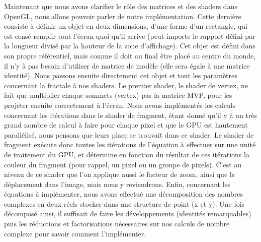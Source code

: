 \documentclass[11pt]{article}
\begin{document}
Maintenant que nous avons clarifier le rôle des matrices et des shaders dans
OpenGL, nous allons pouvoir parler de notre implémentation. Cette dernière
consiste à définir un objet en deux dimensions, d'une forme d'un rectangle, qui
est censé remplir tout l'écran quoi qu'il arrive (peut importe le rapport défini
par la longueur divisé par la hauteur de la zone d'affichage). Cet objet est
défini dans son propre référentiel, mais comme il doit au final être placé au
centre du monde, il n'y à pas besoin d'utiliser de matrice de modèle (elle sera
égale à une matrice identité). Nous passons ensuite directement cet objet et
tout les paramètres concernant la fractale à nos shaders. Le premier shader, le
shader de vertex, ne fait que multiplier chaque sommets (vertex) par la matrice
MVP, pour les projeter ensuite correctement à l'écran. Nous avons implémentés
les calculs concernant les itérations dans le shader de fragment, étant donné
qu'il y à un très grand nombre de calcul à faire pour chaque pixel et que le GPU
est hautement parallélisé, nous pensons que leurs place se trouvait dans ce
shader. Le shader de fragment exécute donc toutes les itérations de l'équation
à effectuer sur une unité de traitement du GPU, et détermine en fonction du
résultat de ces itérations la couleur du fragment (pour rappel, un pixel ou un
groupe de pixels). C'est au niveau de ce shader que l'on applique aussi le
facteur de zoom, ainsi que le déplacement dans l'image, mais nous y reviendrons.
Enfin, concernant les équations à implémenter, nous avons effectué une
décomposition des nombres complexes en deux réels stocker dans une structure de
point (x et y). Une fois décomposé ainsi, il suffisait de faire les
développements (identités remarquables) puis les réductions et factorisations
nécessaires sur nos calculs de nombre complexe pour savoir comment
l'implémenter. 
\end{document}
